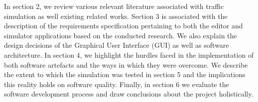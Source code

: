 In section 2, we review various relevant literature associated with traffic simulation as well existing related works. Section 3 is associated with the description of the requirements specification pertaining to both the editor and simulator applications based on the conducted research. We also explain the design decisions of the Graphical User Interface (GUI) as well as software architecture. In section 4, we highlight the hurdles faced in the implementation of both software artefacts and the ways in which they were overcome. We describe the extent to which the simulation was tested in section 5 and the implications this reality holds on software quality. Finally, in section 6 we evaluate the software development process and draw conclusions about the project holistically. 